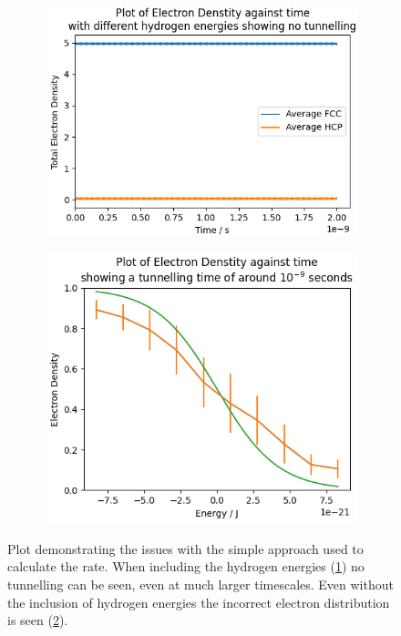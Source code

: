 \begin{figure}[htbp]
    \centering
    \begin{subfigure}{0.45\linewidth}
        \includegraphics[width=0.9\linewidth]{Figures/Simulation/Plot of large band simulation with hydrogen energies.png}
        \label{fig:large band non degenerate simulation}
    \end{subfigure}
    \hfill
    \begin{subfigure}{0.45\linewidth}
        \includegraphics[width=0.9\linewidth]{Figures/Simulation/Plot of large band electron distribution.png}
        \label{fig:large band fermi-dirac}
    \end{subfigure}
    \caption{Plot demonstrating the issues with the
        simple approach used to calculate the rate.
        When including the hydrogen energies
        (\cref{fig:large band non degenerate simulation})
        no tunnelling can be seen, even
        at much larger timescales. Even without the
        inclusion of hydrogen energies
        the incorrect electron distribution is
        seen (\cref{fig:large band fermi-dirac}).}\label{fig:issues with single large band}
\end{figure}

